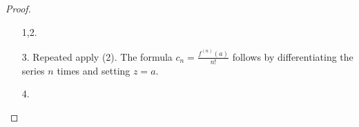 \begin{proof}
    \begin{enumerate}
        \item[1,2.]
        \item[3.] Repeated apply (2). The formula \(c_n = \frac{f^(n)(a)}{n!}\) follows by differentiating the series \(n\) times and setting \(z = a\).
        \item[4.]
    \end{enumerate}
\end{proof}